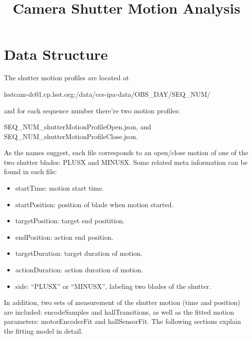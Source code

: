 \documentclass[OPS,lsstdraft,authoryear,toc]{lsstdoc}
\title{Camera Shutter Motion Analysis}
\date{\vcsDate}
\begin{document}
\maketitle

\section{Data Structure}
The shutter motion profiles are located at
\begin{displayquote}
lsstcam-dc01.cp.lsst.org:/data/ccs-ipa-data/OBS\_DAY/SEQ\_NUM/
\end{displayquote}
and for each sequence number there're two motion profiles:
\begin{displayquote}
SEQ\_NUM\_shutterMotionProfileOpen.json, and  \\ SEQ\_NUM\_shutterMotionProfileClose.json.
\end{displayquote}
As the names suggest, each file corresponds to an open/close motion of one of the two shutter blades: PLUSX and MINUSX.
Some related meta information can be found in each file:
\begin{itemize}
    \item[] startTime: motion start time.
    \item[] startPosition: position of blade when motion started.
    \item[] targetPosition: target end positition.
    \item[] endPosition: action end position.
    \item[] targetDuration: target duration of motion.
    \item[] actionDuration: action duration of motion.
    \item[] side: ``PLUSX'' or ``MINUSX'', labeling two blades of the shutter.
\end{itemize}
In addition, two sets of measurement of the shutter motion (time and position) are included: encodeSamples and hallTransitions, as well as the fitted motion parameters: motorEncoderFit and hallSensorFit.  The following sections explain the fitting model in detail.
\end{document}

